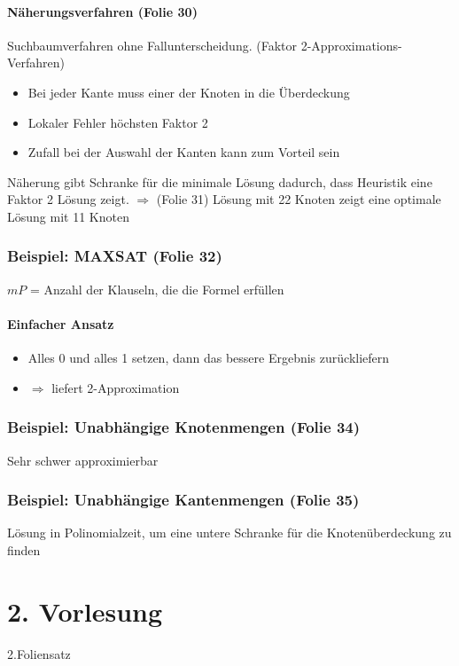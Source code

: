 \documentclass[ngerman]{scrartcl}
\begin{document}
\paragraph*{Näherungsverfahren (Folie 30)}
Suchbaumverfahren ohne Fallunterscheidung. (Faktor 2-Approximations-Verfahren)
\begin{itemize}
  \item Bei jeder Kante muss einer der Knoten in die Überdeckung 
  \item Lokaler Fehler höchsten Faktor 2
  \item Zufall bei der Auswahl der Kanten kann zum Vorteil sein
\end{itemize} 

Näherung gibt Schranke für die minimale Lösung dadurch, dass Heuristik eine Faktor 2 Lösung zeigt.
$\Rightarrow$ (Folie 31) Lösung mit 22 Knoten zeigt eine optimale Lösung mit 11 Knoten

\subsubsection{Beispiel: MAXSAT (Folie 32)}
$ mP $ = Anzahl der Klauseln, die die Formel erfüllen
\paragraph*{Einfacher Ansatz}
\begin{itemize}
  \item Alles 0 und alles 1 setzen, dann das bessere Ergebnis zurückliefern
  \item $\Rightarrow$ liefert 2-Approximation
\end{itemize}

\subsubsection{Beispiel: Unabhängige Knotenmengen (Folie 34)}
Sehr schwer approximierbar

\subsubsection{Beispiel: Unabhängige Kantenmengen (Folie 35)}
Lösung in Polinomialzeit, um eine untere Schranke für die Knotenüberdeckung zu finden


\section{2. Vorlesung}
2.Foliensatz
\end{document}

